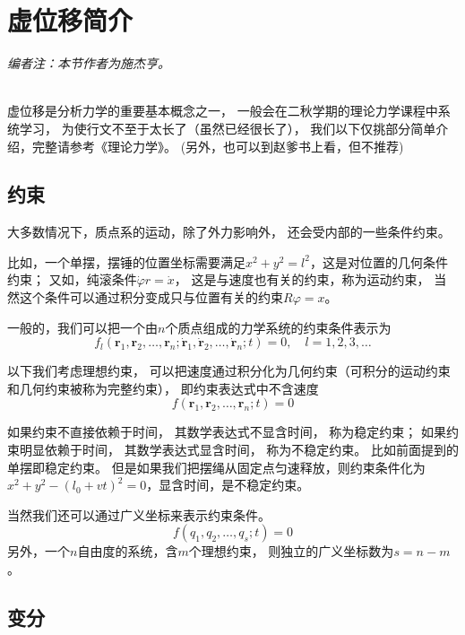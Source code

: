 \newcommand{\wf}{\mathrm{d}}
\newcommand{\e}{\mathrm{e}}
\newcommand{\curl}{\nabla\times}
\newcommand{\divi}{\nabla\cdot}

\chapter{虚位移简介}

\emph{编者注：本节作者为施杰亨。\\\\}

虚位移是分析力学的重要基本概念之一，
一般会在二秋学期的理论力学课程中系统学习，
为使行文不至于太长了（虽然已经很长了），
我们以下仅挑部分简单介绍，完整请参考《理论力学》。
(另外，也可以到赵爹书上看，但不推荐)

\section{约束}

大多数情况下，质点系的运动，除了外力影响外，
还会受内部的一些条件约束。\par
比如，一个单摆，摆锤的位置坐标需要满足\(x^2+y^2=l^2\)，这是对位置的几何条件约束；
又如，纯滚条件\(\dot{\varphi} r=\dot{x}\)，
这是与速度也有关的约束，称为运动约束，
当然这个条件可以通过积分变成只与位置有关的约束\(R\varphi=x\)。\par
一般的，我们可以把一个由\(n\)个质点组成的力学系统的约束条件表示为
\[f_l(\boldsymbol{r}_1,\boldsymbol{r}_2,
\dots,\boldsymbol{r}_n; \dot{\boldsymbol{r}}_1,
\dot{\boldsymbol{r}}_2,\dots,\dot{\boldsymbol{r}}_n;t)=0,
\quad l=1,2,3,\dots\]
\par
以下我们考虑理想约束，
可以把速度通过积分化为几何约束（可积分的运动约束和几何约束被称为完整约束），
即约束表达式中不含速度
\[f(\boldsymbol{r}_1,\boldsymbol{r}_2,\dots,\boldsymbol{r}_n;t)=0\]
\par
如果约束不直接依赖于时间，
其数学表达式不显含时间，
称为稳定约束；
如果约束明显依赖于时间，
其数学表达式显含时间，
称为不稳定约束。
比如前面提到的单摆即稳定约束。
但是如果我们把摆绳从固定点匀速释放，则约束条件化为
\(x^2+y^2-(l_0+vt)^2=0\)，显含时间，是不稳定约束。
\par
当然我们还可以通过广义坐标来表示约束条件。
\[f(q_1,q_2,\dots,q_s;t)=0\]
另外，一个\(n\)自由度的系统，含\(m\)个理想约束，
则独立的广义坐标数为\(s=n-m\)。

\section{变分}

